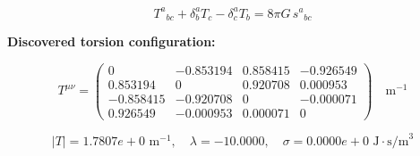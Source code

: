
\begin{equation}
  T^a{}_{bc} + \delta^a_b T_c - \delta^a_c T_b = 8\pi G \, s^a{}_{bc}
\end{equation}

\textbf{Discovered torsion configuration:}

\begin{equation}
  T^{\mu\nu} = \begin{pmatrix}
    0 & -0.853194 & 0.858415 & -0.926549 \\
    0.853194 & 0 & 0.920708 & 0.000953 \\
    -0.858415 & -0.920708 & 0 & -0.000071 \\
    0.926549 & -0.000953 & 0.000071 & 0
  \end{pmatrix} \quad \text{m}^{-1}
\end{equation}

\begin{equation}
  |T| = 1.7807e+0 \text{ m}^{-1}, \quad
  \lambda = -10.0000, \quad
  \sigma = 0.0000e+0 \text{ J}\cdot\text{s/m}^3
\end{equation}